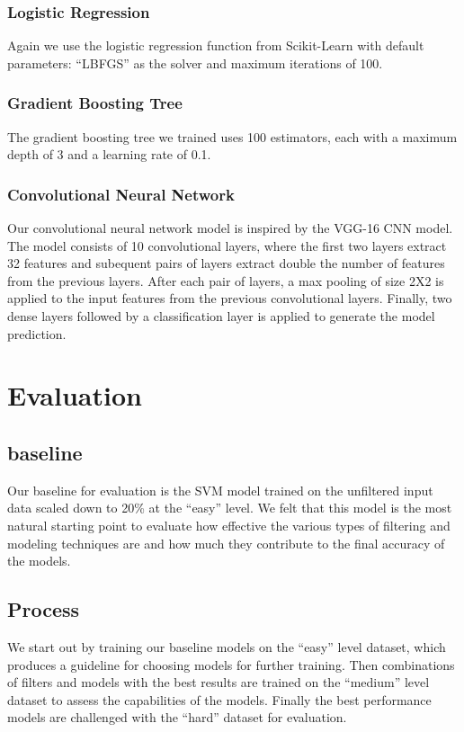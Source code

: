 \documentclass[
	a4paper, %
	10pt, %
	unnumberedsections, %
	twoside, %
]{t0004}
\begin{document}
\subsubsection{Logistic Regression} Again we use the logistic regression function from Scikit-Learn with default parameters: ``LBFGS'' as the solver and maximum iterations of 100.

\subsubsection{Gradient Boosting Tree} The gradient boosting tree we trained uses 100 estimators, each with a maximum depth of 3 and a learning rate of 0.1.

\subsubsection{Convolutional Neural Network}  Our convolutional neural network model is inspired by the VGG-16 CNN model. The model consists of 10 convolutional layers, where the first two layers extract 32 features and subequent pairs of layers extract double the number of features from the previous layers. After each pair of layers, a max pooling of size 2X2 is applied to the input features from the previous convolutional layers. Finally, two dense layers followed by a classification layer is applied to generate the model prediction. 

\section{Evaluation}

\subsection{baseline}

Our baseline for evaluation is the SVM model trained on the unfiltered input data scaled down to 20\% at the ``easy'' level. We felt that this model is the most natural starting point to evaluate how effective the various types of filtering and modeling techniques are and how much they contribute to the final accuracy of the models.

\subsection{Process}

We start out by training our baseline models on the ``easy'' level dataset, which produces a guideline for choosing models for further training. Then combinations of filters and models with the best results are trained on the ``medium'' level dataset to assess the capabilities of the models. Finally the best performance models are challenged with the ``hard'' dataset for evaluation.
\end{document}

